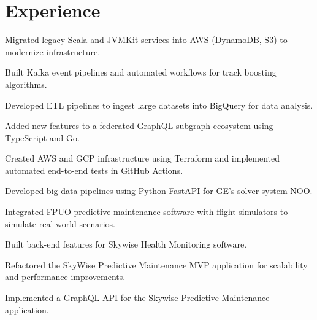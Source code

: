 \documentclass[]{pb-resume}
\begin{document}
\begin{minipage}[t]{0.66\textwidth} 

\section{Experience}

\vspace{10pt} %
\begin{tightemize}
\item Migrated legacy Scala and JVMKit services into AWS (DynamoDB, S3) to modernize infrastructure.
\item Built Kafka event pipelines and automated workflows for track boosting algorithms.
\item Developed ETL pipelines to ingest large datasets into BigQuery for data analysis.
\item Added new features to a federated GraphQL subgraph ecosystem using TypeScript and Go.
\item Created AWS and GCP infrastructure using Terraform and implemented automated end-to-end tests in GitHub Actions.
\end{tightemize}
\sectionsep

\vspace{0pt} %
\begin{tightemize}
\item Developed big data pipelines using Python FastAPI for GE's solver system NOO.
\item Integrated FPUO predictive maintenance software with flight simulators to simulate real-world scenarios.
\item Built back-end features for Skywise Health Monitoring software.
\item Refactored the SkyWise Predictive Maintenance MVP application for scalability and performance improvements.
\item Implemented a GraphQL API for the Skywise Predictive Maintenance application.
\end{tightemize}
\sectionsep


\end{minipage}
\end{document}
